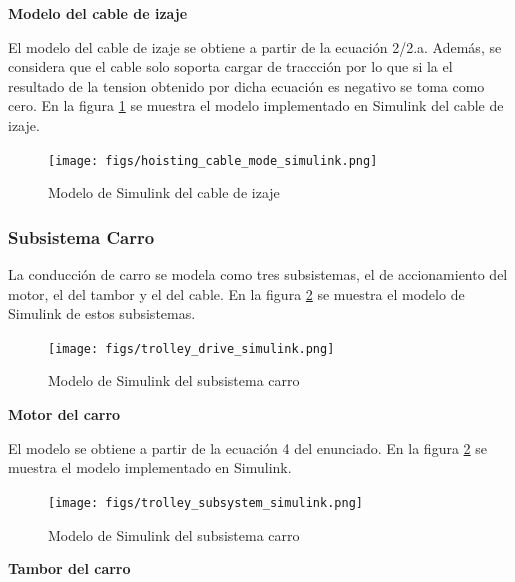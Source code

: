 \documentclass{article}
\begin{document}
            \textbf{Modelo del cable de izaje}

            El modelo del cable de izaje se obtiene a partir de la ecuación 2/2.a. Además, se considera que el cable solo soporta cargar de traccción por lo que si la el resultado de la tension obtenido por dicha ecuación es negativo se toma como cero. En la figura \ref{fig:hoisting_cable_mode_simulink} se muestra el modelo implementado en Simulink del cable de izaje.

            \begin{figure} [H]
                \centering
                \texttt{[image: figs/hoisting\_cable\_mode\_simulink.png]}
                \caption{Modelo de Simulink del cable de izaje}
                \label{fig:hoisting_cable_mode_simulink}
            \end{figure}



            

        \subsubsection{Subsistema Carro}

            La conducción de carro se modela como tres subsistemas, el de accionamiento del motor, el del tambor y el del cable. En la figura \ref{fig:trolley_drive_simulink} se muestra el modelo de Simulink de estos subsistemas. 

            \begin{figure} [H]
                \centering
                \texttt{[image: figs/trolley\_drive\_simulink.png]}
                \caption{Modelo de Simulink del subsistema carro}
                \label{fig:trolley_drive_simulink}
            \end{figure}

            \textbf{Motor del carro}

            El modelo se obtiene a partir de la ecuación 4 del enunciado. En la figura \ref{fig:trolley_drive_simulink} se muestra el modelo implementado en Simulink.

            \begin{figure} [H]
                \centering
                \texttt{[image: figs/trolley\_subsystem\_simulink.png]}
                \caption{Modelo de Simulink del subsistema carro}
                \label{fig:trolley_subsystem_simulink}
            \end{figure}

            \textbf{Tambor del carro}
\end{document}
